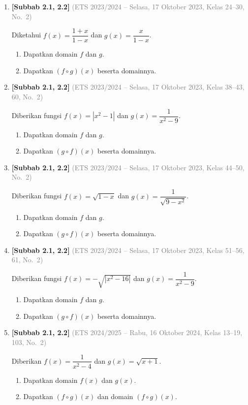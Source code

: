 \documentclass[10pt,openany,a4paper]{article}
\theoremstyle{definition}
\theoremstyle{definition}
\theoremstyle{plain}
\begin{document}
\begin{enumerate}
    \item \textbf{[Subbab 2.1, 2.2]} {\footnotesize\textcolor{gray}{(ETS 2023/2024 -- Selasa, 17 Oktober 2023, Kelas 24--30, No.~2)}}\par
    Diketahui $f(x)=\dfrac{1+x}{1-x}$ dan $g(x)=\dfrac{x}{1-x}$.
    \begin{enumerate}
        \item Dapatkan domain $f$ dan $g$.
        \item Dapatkan $(f\circ g)(x)$ beserta domainnya.
    \end{enumerate}

    \item \textbf{[Subbab 2.1, 2.2]} {\footnotesize\textcolor{gray}{(ETS 2023/2024 -- Selasa, 17 Oktober 2023, Kelas 38--43, 60, No.~2)}}\par
    Diberikan fungsi $f(x)=|x^2-1|$ dan $g(x)=\dfrac{1}{x^2-9}$.
    \begin{enumerate}
        \item Dapatkan domain $f$ dan $g$.
        \item Dapatkan $(g\circ f)(x)$ beserta domainnya.
    \end{enumerate}

    \item \textbf{[Subbab 2.1, 2.2]} {\footnotesize\textcolor{gray}{(ETS 2023/2024 -- Selasa, 17 Oktober 2023, Kelas 44--50, No.~2)}}\par
    Diberikan fungsi $f(x)=\sqrt{1-x}$ dan $g(x)=\dfrac{1}{\sqrt{9-x^2}}$.
    \begin{enumerate}
        \item Dapatkan domain $f$ dan $g$.
        \item Dapatkan $(g\circ f)(x)$ beserta domainnya.
    \end{enumerate}

    \item \textbf{[Subbab 2.1, 2.2]} {\footnotesize\textcolor{gray}{(ETS 2023/2024 -- Selasa, 17 Oktober 2023, Kelas 51--56, 61, No.~2)}}\par
    Diberikan fungsi $f(x)=-\sqrt{|x^2-16|}$ dan $g(x)=\dfrac{1}{x^2-9}$.
    \begin{enumerate}
        \item Dapatkan domain $f$ dan $g$.
        \item Dapatkan $(g\circ f)(x)$ beserta domainnya.
    \end{enumerate}

    \item \textbf{[Subbab 2.1, 2.2]} {\footnotesize\textcolor{gray}{(ETS 2024/2025 -- Rabu, 16 Oktober 2024, Kelas 13--19, 103, No.~2)}}\par
    Diberikan $f(x)=\dfrac{1}{x^2-4}$ dan $g(x)=\sqrt{x+1}$.
    \begin{enumerate}
        \item Dapatkan domain $f(x)$ dan $g(x)$.
        \item Dapatkan $(f\circ g)(x)$ dan domain $(f\circ g)(x)$.
    \end{enumerate}


\end{enumerate}
\end{document}
